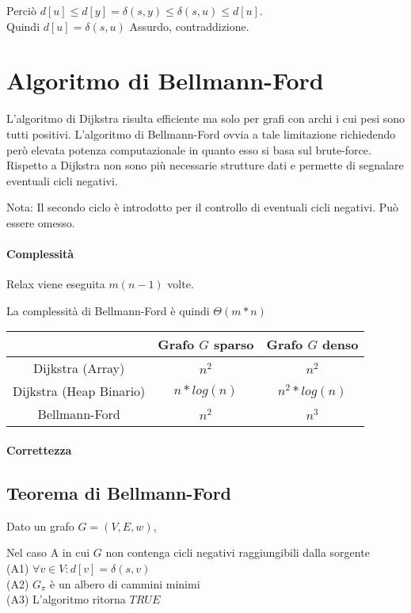 Perciò $d[u] \leq d[y] = \delta(s,y) \leq \delta(s,u) \leq d[u]$. \\ Quindi $d[u]= \delta(s,u)$ Assurdo, contraddizione.


\section{Algoritmo di Bellmann-Ford}

{L'algoritmo di Dijkstra risulta efficiente ma solo per grafi con archi i cui pesi sono tutti positivi. L'algoritmo di Bellmann-Ford ovvia a tale limitazione richiedendo però elevata potenza computazionale in quanto esso si basa sul brute-force. Rispetto a Dijkstra non sono più necessarie strutture dati e permette di segnalare eventuali cicli negativi.}



Nota: Il secondo ciclo è introdotto per il controllo di eventuali cicli negativi. Può essere omesso.

\paragraph{Complessità}

Relax viene eseguita $m(n-1)$ volte.

La complessità di Bellmann-Ford è quindi $\Theta(m*n)$

\begin{tabular}{|c|c|c|}
\hline
  & Grafo $G$ sparso & Grafo $G$ denso \\
\hline
Dijkstra (Array) & $n^2$ & $n^2$ \\
\hline
Dijkstra (Heap Binario) & $n*log(n)$ & $n^2*log(n)$ \\
\hline
Bellmann-Ford & $n^2$ & $n^3$ \\
\hline
\end{tabular}

\paragraph{Correttezza}

\subsection{Teorema di Bellmann-Ford}

Dato un grafo $G=(V,E,w)$,

Nel caso A in cui $G$ non contenga cicli negativi raggiungibili dalla sorgente\\
(A1) $\forall v \in V : d[v] = \delta(s,v)$ \\
(A2) $G_\pi$ è un albero di cammini minimi\\
(A3) L'algoritmo ritorna $TRUE$


